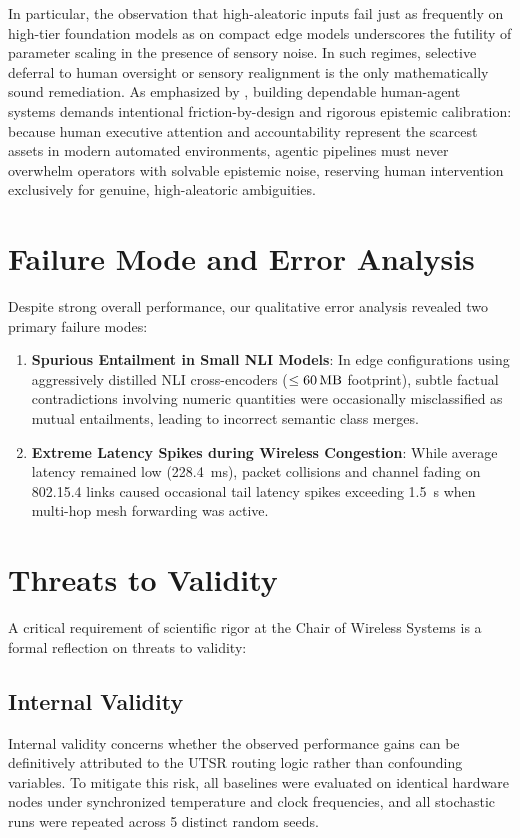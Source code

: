 In particular, the observation that high-aleatoric inputs fail just as frequently on high-tier foundation models as on compact edge models underscores the futility of parameter scaling in the presence of sensory noise. In such regimes, selective deferral to human oversight or sensory realignment is the only mathematically sound remediation. As emphasized by \textcite{meissner2026human}, building dependable human-agent systems demands intentional friction-by-design and rigorous epistemic calibration: because human executive attention and accountability represent the scarcest assets in modern automated environments, agentic pipelines must never overwhelm operators with solvable epistemic noise, reserving human intervention exclusively for genuine, high-aleatoric ambiguities.

\section{Failure Mode and Error Analysis}
\label{sec:disc_failures}

Despite strong overall performance, our qualitative error analysis revealed two primary failure modes:
\begin{enumerate}
    \item \textbf{Spurious Entailment in Small NLI Models}: In edge configurations using aggressively distilled NLI cross-encoders ($\le \SI{60}{\mega\byte}$ footprint), subtle factual contradictions involving numeric quantities were occasionally misclassified as mutual entailments, leading to incorrect semantic class merges.
    \item \textbf{Extreme Latency Spikes during Wireless Congestion}: While average latency remained low (\SI{228.4}{\milli\second}), packet collisions and channel fading on 802.15.4 links caused occasional tail latency spikes exceeding \SI{1.5}{\second} when multi-hop mesh forwarding was active.
\end{enumerate}

\section{Threats to Validity}
\label{sec:disc_threats}

A critical requirement of scientific rigor at the Chair of Wireless Systems is a formal reflection on threats to validity:

\subsection{Internal Validity}
Internal validity concerns whether the observed performance gains can be definitively attributed to the \ac{UTSR} routing logic rather than confounding variables. To mitigate this risk, all baselines were evaluated on identical hardware nodes under synchronized temperature and clock frequencies, and all stochastic runs were repeated across 5 distinct random seeds.

